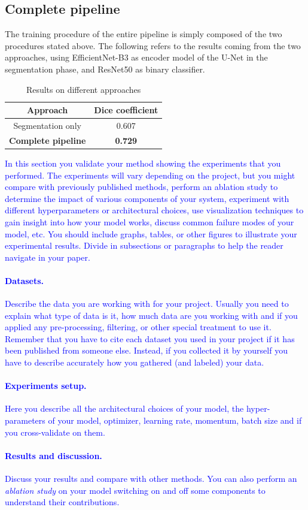 \documentclass[10pt,twocolumn,letterpaper]{article}
\begin{document}
   \subsection{Complete pipeline}
      The training procedure of the entire pipeline is simply composed of the two procedures stated above.
      The following refers to the results coming from the two approaches, using EfficientNet-B3 as encoder model of the U-Net in the segmentation phase, and ResNet50 as binary classifier. 
      \begin{table}[h]
         \centering
         \begin{tabular}{||c c||} 
         \hline
         Approach & Dice coefficient\\ [0.5ex] 
         \hline\hline
         Segmentation only & 0.607 \\ 
         \hline
         \textbf{Complete pipeline} & \textbf{0.729} \\
         \hline
         \end{tabular}
         \caption{Results on different approaches}
         \label{table:res_finals}
      \end{table}


\textcolor{blue}{
In this section you validate your method showing the experiments that you performed. The experiments will vary depending on the project, but you might compare with previously published methods, perform an ablation study to determine the impact of various components of your system, experiment with different hyperparameters or architectural choices, use visualization techniques to gain insight into how your model works, discuss common failure modes of your model, etc. You should include graphs, tables, or other figures to illustrate your experimental results. Divide in subsections or paragraphs to help the reader navigate in your paper.
\paragraph{Datasets.}
Describe the data you are working with for your project. Usually you need to explain what type of data is it, how much data are you working with and if you applied any pre-processing, filtering, or other special treatment to use it. Remember that you have to cite each dataset you used in your project if it has been published from someone else. Instead, if you collected it by yourself you have to describe accurately how you gathered (and labeled) your data. 
\paragraph{Experiments setup.}
Here you describe all the architectural choices of your model, the hyper-parameters of your model, \eg optimizer, learning rate, momentum, batch size and if you cross-validate on them. 
\paragraph{Results and discussion.}
Discuss your results and compare with other methods. You can also perform an \emph{ablation study} on your model switching on and off some components to understand their contributions.
}
\end{document}
